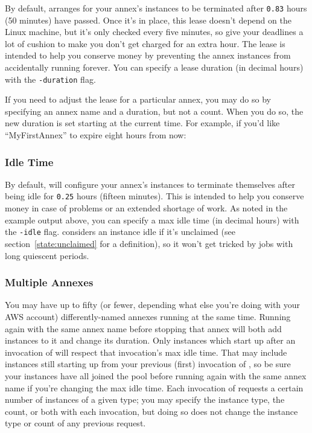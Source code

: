 By default,  arranges for your annex's instances to be terminated
after \texttt{0.83} hours (50 minutes) have passed.  Once it's in place, this
lease doesn't depend on the Linux machine, but it's only checked every five
minutes, so give your deadlines a lot of cushion to make you don't get charged
for an extra hour.  The lease is intended to help you conserve money by
preventing the annex instances from accidentally running forever.
You can specify a lease duration (in decimal hours)
with the \texttt{-duration} flag.

\begin{samepage}
If you need to adjust the lease for a particular annex, you may do so by
specifying an annex name and a duration, but not a count.  When you do so,
the new duration is set starting at the current time.  For example, if you'd
like ``MyFirstAnnex'' to expire eight hours from now:

\end{samepage}

\subsubsection{Idle Time}

By default,  will configure your annex's instances to terminate
themselves after being idle for \texttt{0.25} hours (fifteen minutes).  This
is intended to help you conserve money in case of problems or an extended
shortage of work.  As noted in the example output above, you can specify a max
idle time (in decimal hours) with the \texttt{-idle} flag.  
considers an instance idle if it's unclaimed (see
section~\ref{state:unclaimed} for a definition), so it won't get tricked by
jobs with long quiescent periods.

\subsubsection{Multiple Annexes}

You may have up to fifty (or fewer, depending what else you're doing with your
AWS account) differently-named annexes running at the same time.  Running
 again with the same annex name before stopping that annex will
both add instances to it and change its duration.  Only instances which start
up after an invocation of  will respect that invocation's max
idle time.  That may include instances still starting up from your previous
(first) invocation of , so be sure your instances have all
joined the pool before running  again with the same annex name
if you're changing the max idle time.  Each invocation of 
requests a certain number of instances of a given type; you may specify
the instance type, the count, or both with each invocation, but doing so
does not change the instance type or count of any previous request.

